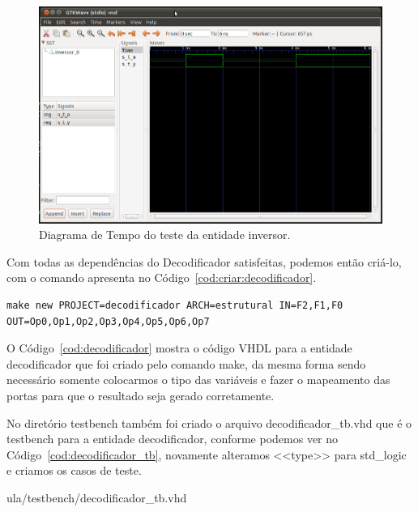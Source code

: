 \documentclass[a4paper,11pt]{report}
\begin{document}
\begin{figure}[H]
\centering
\includegraphics[width=1\textwidth]{figuras/gtw_inversor.png}
\caption{Diagrama de Tempo do teste da entidade inversor.}
\label{fig:gtw:inversor}
\end{figure}

Com todas as dependências do Decodificador satisfeitas, podemos então criá-lo, com o comando apresenta no Código~\ref{cod:criar:decodificador}.

\lstset{numbers=left, numberstyle=\tiny, stepnumber=1, numbersep=3pt}
\begin{lstlisting}[label=cod:criar:decodificador,caption=Comando para a criar a entidade Decodificador.]
  make new PROJECT=decodificador ARCH=estrutural IN=F2,F1,F0 OUT=Op0,Op1,Op2,Op3,Op4,Op5,Op6,Op7
\end{lstlisting}

O Código~\ref{cod:decodificador} mostra o código VHDL para a entidade decodificador que foi criado pelo comando make, da mesma forma sendo necessário somente colocarmos o tipo das variáveis e fazer o mapeamento das portas para que o resultado seja gerado corretamente.

\lstset{language=VHDL}
\lstset{numbers=left, numberstyle=\tiny, stepnumber=1, numbersep=3pt}


No diretório testbench também foi criado o arquivo decodificador\_tb.vhd que é o testbench para a entidade decodificador, conforme podemos ver no Código~\ref{cod:decodificador_tb}, novamente alteramos <<type>> para std\_logic e criamos os casos de teste.

\lstset{language=VHDL}
\lstset{numbers=left, numberstyle=\tiny, stepnumber=1, numbersep=3pt}
 {ula/testbench/decodificador_tb.vhd}
\end{document}
